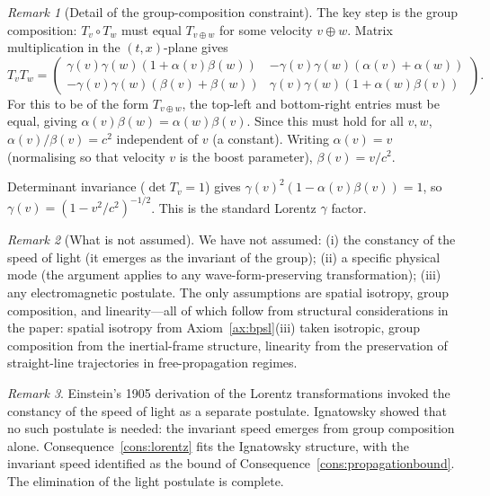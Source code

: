 \documentclass[11pt,twocolumn,a4paper]{article}
\theoremstyle{axiomstyle}
\theoremstyle{conseqstyle}
\theoremstyle{definition}
\theoremstyle{remark}
\newtheorem*{remark}{Remark}
\begin{document}
\begin{remark}[Detail of the group-composition constraint]
The key step is the group composition: $T_{v}\circ T_{w}$ must equal $T_{v\oplus w}$ for some velocity $v\oplus w$. Matrix multiplication in the $(t,x)$-plane gives
\begin{equation*}
T_{v}T_{w}=\begin{pmatrix}\gamma(v)\gamma(w)(1+\alpha(v)\beta(w))&-\gamma(v)\gamma(w)(\alpha(v)+\alpha(w))\\-\gamma(v)\gamma(w)(\beta(v)+\beta(w))&\gamma(v)\gamma(w)(1+\alpha(w)\beta(v))\end{pmatrix}.
\end{equation*}
For this to be of the form $T_{v\oplus w}$, the top-left and bottom-right entries must be equal, giving $\alpha(v)\beta(w)=\alpha(w)\beta(v)$. Since this must hold for all $v,w$, $\alpha(v)/\beta(v)=c^{2}$ independent of $v$ (a constant). Writing $\alpha(v)=v$ (normalising so that velocity $v$ is the boost parameter), $\beta(v)=v/c^{2}$.

Determinant invariance ($\det T_{v}=1$) gives $\gamma(v)^{2}(1-\alpha(v)\beta(v))=1$, so $\gamma(v)=(1-v^{2}/c^{2})^{-1/2}$. This is the standard Lorentz $\gamma$ factor.
\end{remark}

\begin{remark}[What is not assumed]
We have not assumed: (i) the constancy of the speed of light (it emerges as the invariant of the group); (ii) a specific physical mode (the argument applies to any wave-form-preserving transformation); (iii) any electromagnetic postulate. The only assumptions are spatial isotropy, group composition, and linearity---all of which follow from structural considerations in the paper: spatial isotropy from Axiom~\ref{ax:bpsl}(iii) taken isotropic, group composition from the inertial-frame structure, linearity from the preservation of straight-line trajectories in free-propagation regimes.
\end{remark}

\begin{remark}
Einstein's 1905 derivation \citep{einstein1905relativity} of the Lorentz transformations invoked the constancy of the speed of light as a separate postulate. Ignatowsky \citep{ignatowsky1910} showed that no such postulate is needed: the invariant speed emerges from group composition alone. Consequence~\ref{cons:lorentz} fits the Ignatowsky structure, with the invariant speed identified as the bound of Consequence~\ref{cons:propagationbound}. The elimination of the light postulate is complete.
\end{remark}
\end{document}

